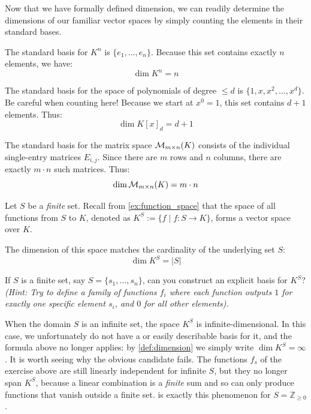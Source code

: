 Now that we have formally defined dimension, we can readily determine the dimensions of our familiar vector spaces by simply counting the elements in their standard bases.

\begin{example}
The standard basis for $K^n$ is $\{e_1, \dots, e_n\}$. Because this set contains exactly $n$ elements, we have:
\[
\dim K^n = n
\]
\end{example}

\begin{example}
The standard basis for the space of polynomials of degree $\le d$ is $\{1, x, x^2, \dots, x^d\}$. Be careful when counting here! Because we start at $x^0 = 1$, this set contains $d+1$ elements. Thus:
\[
\dim K[x]_d = d + 1
\]
\end{example}

\begin{example}[Matrices]
The standard basis for the matrix space $\mathcal{M}_{m \times n}(K)$ consists of the individual single-entry matrices $E_{i,j}$. Since there are $m$ rows and $n$ columns, there are exactly $m \cdot n$ such matrices. Thus:
\[
\dim \mathcal{M}_{m \times n}(K) = m \cdot n
\]
\end{example}

\begin{example}
Let $S$ be a \emph{finite} set. Recall from \cref{ex:function_space} that the space of all functions from $S$ to $K$, denoted as $K^S := \{f \mid f: S \to K\}$, forms a vector space over $K$.

The dimension of this space matches the cardinality of the underlying set $S$:
\[
\dim K^S = |S|
\]

\begin{exercise}
\label{exc:basis_of_function_space}
If $S$ is a finite set, say $S = \{s_1, \dots, s_n\}$, can you construct an explicit basis for $K^S$? \\
\textit{(Hint: Try to define a family of functions $f_i$ where each function outputs $1$ for exactly one specific element $s_i$, and $0$ for all other elements).}
\end{exercise}

\begin{remark}
\label{rem:infinite_function_space}
When the domain $S$ is an infinite set, the space $K^S$ is infinite-dimensional. In this case, we unfortunately do not have a  or easily describable basis for it, and the formula above no longer applies: by \cref{def:dimension} we simply write $\dim K^S = \infty$. It is worth seeing why the obvious candidate fails. The functions $f_s$ of the exercise above are still linearly independent for infinite $S$, but they no longer span $K^S$, because a linear combination is a \emph{finite} sum and so can only produce functions that vanish outside a finite set.  is exactly this phenomenon for $S = \mathbb{Z}_{\ge 0}$.
\end{remark}
\end{example}

